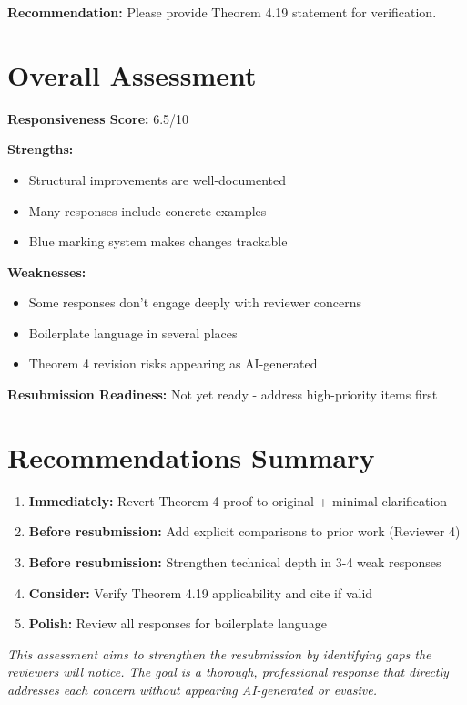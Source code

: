 \documentclass[11pt]{article}
\begin{document}
\textbf{Recommendation:} Please provide Theorem 4.19 statement for verification.

\section{Overall Assessment}

\textbf{Responsiveness Score:} 6.5/10

\textbf{Strengths:}
\begin{itemize}
\item Structural improvements are well-documented
\item Many responses include concrete examples
\item Blue marking system makes changes trackable
\end{itemize}

\textbf{Weaknesses:}
\begin{itemize}
\item Some responses don't engage deeply with reviewer concerns
\item Boilerplate language in several places
\item Theorem 4 revision risks appearing as AI-generated
\end{itemize}

\textbf{Resubmission Readiness:} \textcolor{warning}{Not yet ready - address high-priority items first}

\section{Recommendations Summary}

\begin{enumerate}
\item \textbf{Immediately:} Revert Theorem 4 proof to original + minimal clarification
\item \textbf{Before resubmission:} Add explicit comparisons to prior work (Reviewer 4)
\item \textbf{Before resubmission:} Strengthen technical depth in 3-4 weak responses
\item \textbf{Consider:} Verify Theorem 4.19 applicability and cite if valid
\item \textbf{Polish:} Review all responses for boilerplate language
\end{enumerate}

\vspace{1cm}

\noindent\textit{This assessment aims to strengthen the resubmission by identifying gaps the reviewers will notice. The goal is a thorough, professional response that directly addresses each concern without appearing AI-generated or evasive.}
\end{document}
